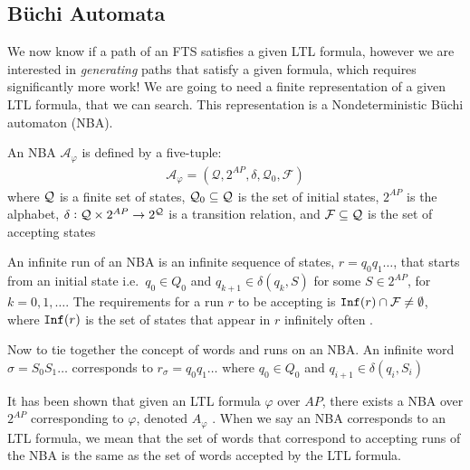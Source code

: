 \subsection{B\"{u}chi Automata}
We now know if a path of an FTS satisfies a given LTL formula, however we are interested in \textit{generating} paths that satisfy a given formula, which requires significantly more work! We are going to need a finite representation of a given LTL formula, that we can search. This representation is a Nondeterministic B\"{u}chi automaton (NBA). 
\begin{definition}
\label{defNBA}
An NBA $\mathcal{A}_\varphi$ is defined by a five-tuple:
\begin{align*}
\mathcal{A}_\varphi = (\mathcal{Q},2^{AP},\delta,\mathcal{Q}_0,\mathcal{F})
\end{align*}
where $\mathcal{Q}$ is a finite set of states, $\mathcal{Q}_0 \subseteq \mathcal{Q}$ is the set of initial states, $2^{AP}$ is the alphabet, $\delta: \mathcal{Q} \times 2^{AP} \rightarrow 2^{\mathcal{Q}}$ is a transition relation, and $\mathcal{F} \subseteq \mathcal{Q}$ is the set of accepting states
\end{definition} 
An infinite run of an NBA is an infinite sequence of states, $r=q_0 q_1 \dots$, that starts from an initial state i.e.\ $q_0 \in Q_0$ and $q_{k+1} \in \delta(q_k, S)$ for some $S \in 2^{AP}$, for $k = 0,1,\dots$. The requirements for a run $r$ to be accepting is $\texttt{Inf}(r) \cap \mathcal{F} \neq \emptyset$, where $\texttt{Inf}(r)$ is the set of states that appear in $r$ infinitely often \cite{guo15}. 

Now to tie together the concept of words and runs on an NBA. An infinite word $\sigma = S_0 S_1 \dots$ corresponds to $r_\sigma = q_0 q_1 \dots$ where $q_0 \in Q_0$ and $q_{i+1} \in \delta(q_i,S_i)$

It has been shown that given an LTL formula $\varphi$ over $AP$, there exists a NBA over $2^{AP}$ corresponding to $\varphi$, denoted $A_\varphi$ \cite{baier08}. When we say an NBA corresponds to an LTL formula, we mean that the set of words that correspond to accepting runs of the NBA is the same as the set of words accepted by the LTL formula.  

